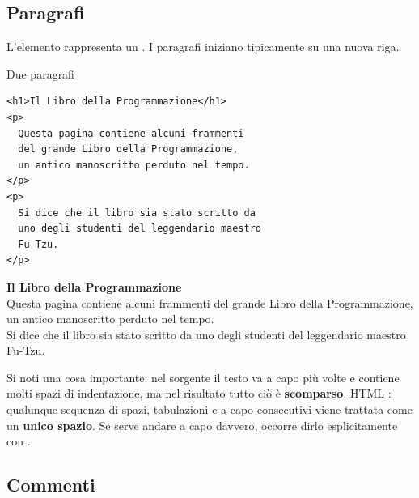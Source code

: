 
\subsection{Paragrafi}

L'elemento  rappresenta un . I paragrafi iniziano
tipicamente su una nuova riga.

\begin{esempio}{Due paragrafi}
\begin{affianco}[0.46]
\begin{lstlisting}[style=html, name=paragrafi.html]
<h1>Il Libro della Programmazione</h1>
<p>
  Questa pagina contiene alcuni frammenti
  del grande Libro della Programmazione,
  un antico manoscritto perduto nel tempo.
</p>
<p>
  Si dice che il libro sia stato scritto da
  uno degli studenti del leggendario maestro
  Fu-Tzu.
</p>
\end{lstlisting}
\risultato
\begin{browser}
  {\Lora\bfseries\LARGE Il Libro della Programmazione}\\[6pt]
  Questa pagina contiene alcuni frammenti del grande Libro della Programmazione,
  un antico manoscritto perduto nel tempo.\\[6pt]
  Si dice che il libro sia stato scritto da uno degli studenti del leggendario
  maestro Fu-Tzu.
\end{browser}
\end{affianco}

Si noti una cosa importante: nel sorgente il testo va a capo più volte e
contiene molti spazi di indentazione, ma nel risultato tutto ciò è
\textbf{scomparso}. HTML : qualunque sequenza di
spazi, tabulazioni e a-capo consecutivi viene trattata come un \textbf{unico
spazio}. Se serve andare a capo davvero, occorre dirlo esplicitamente con
.
\end{esempio}

\subsection{Commenti}

